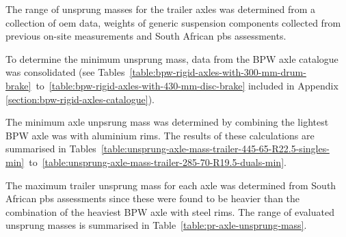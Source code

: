 The range of unsprung masses for the trailer axles was determined from a collection of \gls{oem} data,  weights of generic suspension components collected from previous on-site measurements and South African \gls{pbs} assessments. 

To determine the minimum unsprung mass, data from the BPW axle catalogue was consolidated (see Tables~\ref{table:bpw-rigid-axles-with-300-mm-drum-brake}~to~\ref{table:bpw-rigid-axles-with-430-mm-disc-brake} included in Appendix \ref{section:bpw-rigid-axles-catalogue}). 

The minimum axle unpsrung mass was determined by combining the lightest BPW axle was with aluminium rims. The results of these calculations are summarised in Tables~\ref{table:unsprung-axle-mass-trailer-445-65-R22.5-singles-min}~to~\ref{table:unsprung-axle-mass-trailer-285-70-R19.5-duals-min}. 

The maximum trailer unsprung mass for each axle was determined from South African \gls{pbs} assessments since these were found to be heavier than the combination of the heaviest BPW axle with steel rims. The range of evaluated unsprung masses is summarised in Table~\ref{table:pr-axle-unsprung-mass}.


